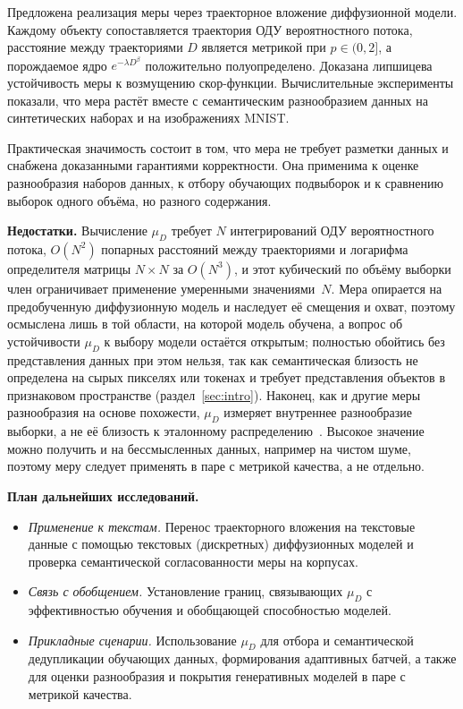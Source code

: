 \documentclass[14pt, a4paper]{extarticle}
\theoremstyle{definition}
\theoremstyle{plain}
\begin{document}
Предложена реализация меры через траекторное вложение диффузионной модели. Каждому
объекту сопоставляется траектория ОДУ вероятностного потока, расстояние между
траекториями $D$ является метрикой при $p\in(0,2]$, а порождаемое ядро
$e^{-\lambda D^\beta}$ положительно полуопределено. Доказана липшицева устойчивость
меры к возмущению скор-функции. Вычислительные эксперименты показали, что мера
растёт вместе с семантическим разнообразием данных на синтетических наборах и на
изображениях MNIST.

Практическая значимость состоит в том, что мера не требует разметки данных и
снабжена доказанными гарантиями корректности. Она применима к оценке разнообразия
наборов данных, к отбору обучающих подвыборок и к сравнению выборок одного объёма,
но разного содержания.

\textbf{Недостатки.} Вычисление $\mu_D$ требует $N$ интегрирований ОДУ
вероятностного потока, $O(N^2)$ попарных расстояний между траекториями и логарифма
определителя матрицы $N\times N$ за $O(N^3)$, и этот кубический по объёму выборки
член ограничивает применение умеренными значениями~$N$. Мера опирается на
предобученную диффузионную модель и наследует её смещения и охват, поэтому
осмыслена лишь в той области, на которой модель обучена, а вопрос об устойчивости
$\mu_D$ к выбору модели остаётся открытым; полностью обойтись без представления
данных при этом нельзя, так как семантическая близость не определена на сырых
пикселях или токенах и требует представления объектов в признаковом пространстве
(раздел~\ref{sec:intro}). Наконец, как и другие меры разнообразия на основе
похожести, $\mu_D$ измеряет внутреннее разнообразие выборки, а не её близость к
эталонному распределению~\cite{FriedmanDieng2023Vendi,PasarkarDieng2024Cousins}.
Высокое значение можно получить и на бессмысленных данных, например на чистом шуме,
поэтому меру следует применять в паре с метрикой качества, а не отдельно.

\textbf{План дальнейших исследований.}
\begin{itemize}
    \item \emph{Применение к текстам.} Перенос траекторного вложения на текстовые
          данные с помощью текстовых (дискретных) диффузионных моделей и проверка
          семантической согласованности меры на корпусах.
    \item \emph{Связь с обобщением.} Установление границ, связывающих $\mu_D$ с
          эффективностью обучения и обобщающей способностью моделей.
    \item \emph{Прикладные сценарии.} Использование $\mu_D$ для отбора и
          семантической дедупликации обучающих данных, формирования адаптивных
          батчей, а также для оценки разнообразия и покрытия генеративных моделей
          в паре с метрикой качества.
\end{itemize}
\end{document}
